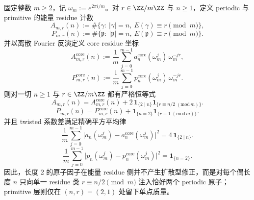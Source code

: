 \begin{theorem}\label{thm:xi-atomic-witt-energy-residue-l2-law}
固定整数 \(m\ge 2\)，记 \(\omega_m:=e^{2\pi i/m}\)。对 \(r\in \ZZ/m\ZZ\) 与 \(n\ge 1\)，定义 periodic 与 primitive 的能量 residue 计数
\[
A_{m,r}(n):=\#\{\gamma:\ |\gamma|=n,\ E(\gamma)\equiv r\pmod m\},
\]
\[
P_{m,r}(n):=\#\{\mathfrak p:\ |\mathfrak p|=n,\ E(\mathfrak p)\equiv r\pmod m\}.
\]
并以离散 Fourier 反演定义 core residue 坐标
\[
A_{m,r}^{\mathrm{core}}(n)
:=
\frac1m\sum_{j=0}^{m-1}a_n^{\mathrm{core}}(\omega_m^j)\,\omega_m^{-jr},
\]
\[
P_{m,r}^{\mathrm{core}}(n)
:=
\frac1m\sum_{j=0}^{m-1}p_n^{\mathrm{core}}(\omega_m^j)\,\omega_m^{-jr}.
\]
则对一切 \(n\ge 1\) 与 \(r\in \ZZ/m\ZZ\) 都有严格恒等式
\[
\boxed{\;
A_{m,r}(n)
=
A_{m,r}^{\mathrm{core}}(n)
+2\,\mathbf 1_{\{2\mid n\}}\mathbf 1_{\{r\equiv n/2\;(\mathrm{mod}\,m)\}}.\;}
\]
\[
\boxed{\;
P_{m,r}(n)
=
P_{m,r}^{\mathrm{core}}(n)
+\mathbf 1_{\{n=2\}}\mathbf 1_{\{r\equiv 1\;(\mathrm{mod}\,m)\}}.\;}
\]
并且 twisted 系数差满足精确平方平均律
\[
\boxed{\;
\frac1m\sum_{j=0}^{m-1}
\bigl|a_n(\omega_m^j)-a_n^{\mathrm{core}}(\omega_m^j)\bigr|^2
=
4\,\mathbf 1_{\{2\mid n\}}.\;}
\]
\[
\boxed{\;
\frac1m\sum_{j=0}^{m-1}
\bigl|p_n(\omega_m^j)-p_n^{\mathrm{core}}(\omega_m^j)\bigr|^2
=
\mathbf 1_{\{n=2\}}.\;}
\]
因此，长度 \(2\) 的原子因子在能量 residue 侧并不产生扩散型修正，而是对每个偶长度 \(n\) 只向单一 residue 类 \(r\equiv n/2\pmod m\) 注入恰好两个 periodic 原子；primitive 层则仅在 \((n,r)=(2,1)\) 处留下单点质量。
\end{theorem}
